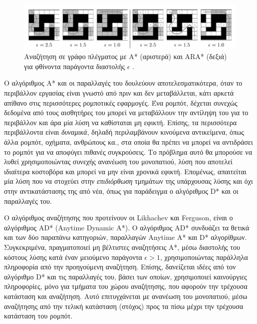 \begin{figure}[!ht]
	\centering
	\includegraphics[width=\linewidth]{Chapters/Chapter3/Figures/arastar.png}
	\caption[Αναζήτηση σε γράφο πλέγματος με Α* (αριστερά) και ARA* (δεξιά) για μειούμενο παράγοντα διαστολής $\epsilon$.]{Αναζήτηση σε γράφο πλέγματος με Α* (αριστερά) και ARA* (δεξιά) για φθίνοντα παράγοντα διαστολής $\epsilon$ \cite{arastar}.}
	\label{fig:arastar}
\end{figure}

\bigskip
Ο αλγόριθμος Α* και οι παραλλαγές του δουλεύουν αποτελεσματικότερα, όταν το περιβάλλον εργασίας είναι γνωστό από πριν και δεν μεταβάλλεται, κάτι αρκετά απίθανο στις περισσότερες ρομποτικές εφαρμογές. Ένα ρομπότ, δέχεται συνεχώς δεδομένα από τους αισθητήρες του μπορεί να μεταβάλλουν την αντίληψη του για το περιβάλλον και άρα μία λύση να καθίσταται μη εφικτή. Επίσης, τα περισσότερα περιβάλλοντα είναι \textit{δυναμικά}, δηλαδή περιλαμβάνουν κινούμενα αντικείμενα, όπως άλλα ρομπότ, οχήματα, ανθρώπους κα., στα οποία θα πρέπει να μπορεί να αντιδράσει το ρομπότ για να αποφύγει πιθανές συγκρούσεις. Το πρόβλημα αυτό θα μπορούσε να λυθεί χρησιμοποιώντας συνεχής ανανέωση του μονοπατιού, λύση που αποτελεί ιδιαίτερα κοστοβόρα και μπορεί να μην είναι χρονικά εφικτή. Επομένως, απαιτείται μία λύση που να στοχεύει στην \textit{επιδιόρθωση} τμημάτων της υπάρχουσας λύσης και όχι στην αντικατάστασης της από νέα, όπως για παράδειγμα ο αλγόριθμος D* και οι παραλλαγές του.

\bigskip
Ο αλγόριθμος αναζήτησης που προτείνουν οι Likhachev και Ferguson, είναι ο αλγόριθμος AD* (Anytime Dynamic A*). Ο αλγόριθμος AD* συνδυάζει τα θετικά και των δύο παραπάνω κατηγοριών, παραλλαγών Anytime A* και D* αλγορίθμων. Συγκεκριμένα, πραγματοποιεί μη βέλτιστες αναζητήσεις A*, μέσω διαστολής του κόστους λύσης κατά έναν μειούμενο παράγοντα $\epsilon > 1$, χρησιμοποιώντας παράλληλα πληροφορία από την προηγούμενη αναζήτηση. Επίσης, δανείζεται ιδέες από τον αλγόριθμο D* και τις παραλλαγές του, βάσει των οποίων, χρησιμοποιεί καινούργιες πληροφορίες, μόνο για τμήματα του χώρου αναζήτησης, που αφορούν την τρέχουσα κατάσταση και αναζήτηση. Αυτό επιτυγχάνεται με ανανέωση του μονοπατιού, μέσω αναζήτησης από την τελική κατάσταση (στόχος) προς τα πίσω μέχρι την τρέχουσα κατάσταση του ρομπότ.

